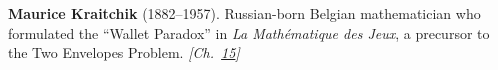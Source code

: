 \textbf{Maurice Kraitchik} (1882–1957). Russian-born Belgian mathematician who formulated the ``Wallet Paradox'' in \emph{La Math\'{e}matique des Jeux}, a precursor to the Two Envelopes Problem. \emph{[Ch.~\hyperref[ch:envelopeparadox]{15}]}

